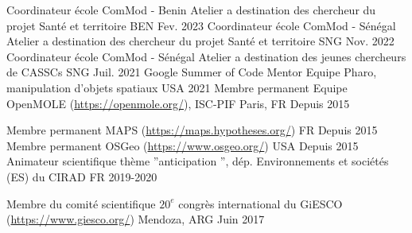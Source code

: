

\begin{cvhonors}


  \cvhonor
     {Coordinateur école ComMod - Benin} %
     {Atelier a destination des chercheur du projet Santé et territoire} %
     {BEN} %
     {Fev. 2023} %
  \cvhonor
    {Coordinateur école ComMod - Sénégal} %
    {Atelier a destination des chercheur du projet Santé et territoire} %
    {SNG} %
    {Nov. 2022} %
  \cvhonor
    {Coordinateur école ComMod - Sénégal} %
    {Atelier a destination des jeunes chercheurs de CASSCs} %
    {SNG} %
    {Juil. 2021} %
  \cvhonor
    {Google Summer of Code Mentor} %
    {Equipe Pharo, manipulation d'objets spatiaux} %
    {USA} %
    {2021} %
    \cvhonor
      {Membre permanent} %
      {Equipe OpenMOLE (\url{https://openmole.org/}), ISC-PIF} %
      {Paris, FR} %
      {Depuis 2015} %

    \cvhonor
      {Membre permanent} %
      {MAPS (\url{https://maps.hypotheses.org/})} %
      {FR} %
      {Depuis 2015} %
    \cvhonor
      {Membre permanent} %
      {OSGeo (\url{https://www.osgeo.org/})} %
      {USA} %
      {Depuis 2015} %
  \cvhonor
    {Animateur scientifique} %
    {thème ”anticipation ”, dép. Environnements et sociétés (ES) du CIRAD} %
    {FR} %
    {2019-2020} %

  \cvhonor
    {Membre du comité scientifique} %
    {$20^{e}$ congrès international du GiESCO (\url{https://www.giesco.org/})} %
    {Mendoza, ARG} %
    {Juin 2017} %


\end{cvhonors}
